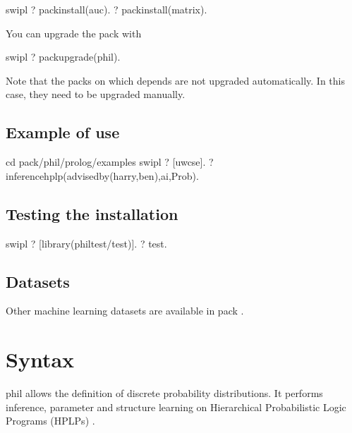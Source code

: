 \documentclass[letterpaper,10pt,english]{sphinxmanual}
\begin{document}
%
\begin{sphinxVerbatim}[commandchars=\\\{\}]
\PYGZdl{} swipl
?\PYGZhy{} pack\PYGZus{}install(auc).
?\PYGZhy{} pack\PYGZus{}install(matrix).
\end{sphinxVerbatim}

You can upgrade the pack with

%
\begin{sphinxVerbatim}[commandchars=\\\{\}]
\PYGZdl{} swipl
?\PYGZhy{} pack\PYGZus{}upgrade(phil).
\end{sphinxVerbatim}

Note that the packs on which  depends are not upgraded automatically. In this case, they need to be upgraded manually.


\section{Example of use}
\label{\detokenize{index:example-of-use}}
%
\begin{sphinxVerbatim}[commandchars=\\\{\}]
\PYGZdl{} cd \PYGZlt{}pack\PYGZgt{}/phil/prolog/examples
\PYGZdl{} swipl
?\PYGZhy{} [uwcse].
?\PYGZhy{} inference\PYGZus{}hplp(advisedby(harry,ben),ai,Prob).
\end{sphinxVerbatim}


\section{Testing the installation}
\label{\detokenize{index:testing-the-installation}}
%
\begin{sphinxVerbatim}[commandchars=\\\{\}]
\PYGZdl{} swipl
?\PYGZhy{} [library(phil\PYGZus{}test/test)].
?\PYGZhy{} test.
\end{sphinxVerbatim}


\section{Datasets}
\label{\detokenize{index:datasets}}
Other machine learning datasets are available in pack .


\chapter{Syntax}
\label{\detokenize{index:syntax}}
phil allows the definition of discrete probability distributions. It performs inference, parameter and structure learning on Hierarchical Probabilistic Logic Programs (HPLPs) \label{\detokenize{index:id2}}{\hyperref[\detokenize{index:ngulamrig17-plp-iw}]{\sphinxcrossref{{[}NguembangFadjaLR17{]}}}}.
\end{document}
